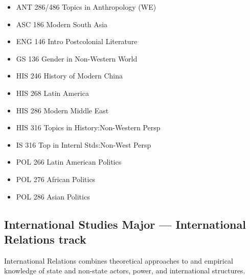 \documentclass[
  letterpaper,
]{scrbook}
\providecommand{\tightlist}{%
  \setlength{\itemsep}{0pt}\setlength{\parskip}{0pt}}
\begin{document}
\begin{enumerate}
  \begin{itemize}
  \tightlist
  \item
    ANT 286/486 Topics in Anthropology (WE)
  \item
    ASC 186 Modern South Asia
  \item
    ENG 146 Intro Postcolonial Literature
  \item
    GS 136 Gender in Non-Western World
  \item
    HIS 246 History of Modern China
  \item
    HIS 268 Latin America
  \item
    HIS 286 Modern Middle East
  \item
    HIS 316 Topics in History:Non-Western Persp
  \item
    IS 316 Top in Internl Stds:Non-West Persp
  \item
    POL 266 Latin American Politics
  \item
    POL 276 African Politics
  \item
    POL 286 Asian Politics
  \end{itemize}
\end{enumerate}

\subsection{International Studies Major --- International Relations
track}\label{international-studies-major-international-relations-track}

International Relations combines theoretical approaches to and empirical
knowledge of state and non-state actors, power, and international
structures.
\end{document}
